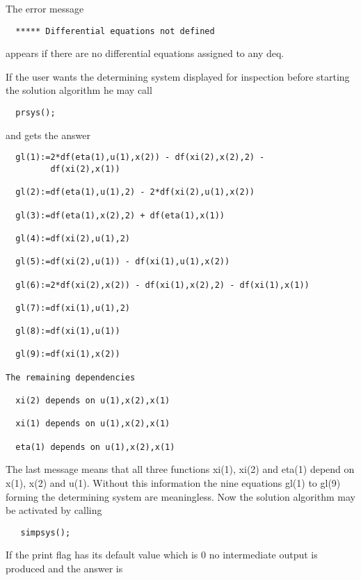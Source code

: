 The error message

\begin{verbatim}
  ***** Differential equations not defined
\end{verbatim}

appears if there are no differential equations assigned to any deq.

If the user wants the determining system displayed for inspection
before starting the solution algorithm he may call

\hypertarget{operator:PRSYS}{}
\begin{verbatim}
  prsys();
\end{verbatim}

and gets the answer

\begin{verbatim}
  gl(1):=2*df(eta(1),u(1),x(2)) - df(xi(2),x(2),2) -
         df(xi(2),x(1))

  gl(2):=df(eta(1),u(1),2) - 2*df(xi(2),u(1),x(2))

  gl(3):=df(eta(1),x(2),2) + df(eta(1),x(1))

  gl(4):=df(xi(2),u(1),2)

  gl(5):=df(xi(2),u(1)) - df(xi(1),u(1),x(2))

  gl(6):=2*df(xi(2),x(2)) - df(xi(1),x(2),2) - df(xi(1),x(1))

  gl(7):=df(xi(1),u(1),2)

  gl(8):=df(xi(1),u(1))

  gl(9):=df(xi(1),x(2))

The remaining dependencies

  xi(2) depends on u(1),x(2),x(1)

  xi(1) depends on u(1),x(2),x(1)

  eta(1) depends on u(1),x(2),x(1)
\end{verbatim}

The last message means that all three functions xi(1), xi(2) and
eta(1) depend on x(1), x(2) and u(1). Without this information the
nine equations gl(1) to gl(9) forming the determining system are
meaningless. Now the solution algorithm may be activated by calling

\begin{verbatim}
   simpsys();
\end{verbatim}

If the print flag  has its default value which is 0 no
intermediate output is produced and the answer is

